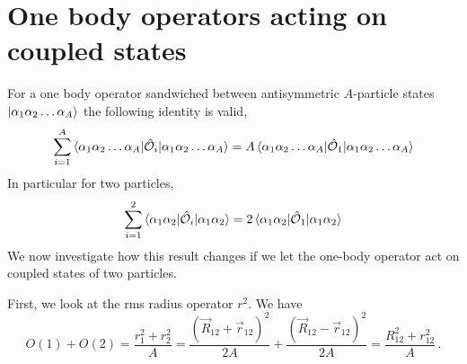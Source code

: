 \documentclass[10pt]{article}
\begin{document}
\section{One body operators acting on coupled states}
For a one body operator sandwiched between antisymmetric $A$-particle states 
$\ket{ \alpha_1 \alpha_2 \ldots \alpha_A}$ the following identity is valid,
\begin{align*}
	\sum_{i=1}^{A} \braket{ \alpha_1 \alpha_2 \ldots \alpha_A | 
\hat{\mathcal{O}}_{i} | \alpha_1 \alpha_2 \ldots \alpha_A} = A \braket{ 
\alpha_1 \alpha_2 \ldots \alpha_A | \hat{\mathcal{O}}_{1} | \alpha_1 \alpha_2 
\ldots \alpha_A}
\end{align*}
In particular for two particles,
\begin{align*}
	\sum_{i=1}^{2} \braket{ \alpha_1 \alpha_2 | \hat{\mathcal{O}}_{i} | 
\alpha_1 \alpha_2} = 2 \braket{ \alpha_1 \alpha_2 | \hat{\mathcal{O}}_{1} | 
\alpha_1 \alpha_2}
\end{align*}
We now investigate how this result changes if we let the one-body operator act 
on coupled states of two particles. 

First, we look at the rms radius operator $r^2$.  We have
\begin{equation} 
O(1)+O(2)=\frac{r_1^2+r_2^2}{A}=\frac{(\vec{R}_{12}+\vec{r}_{12})^2}{2A}+\frac{
(\vec { R } _ { 12 }-\vec{r}_{12})^2}{2A}=\frac{R^2_{12}+r^2_{12}}{A}\,.
\end{equation}
\end{document}
